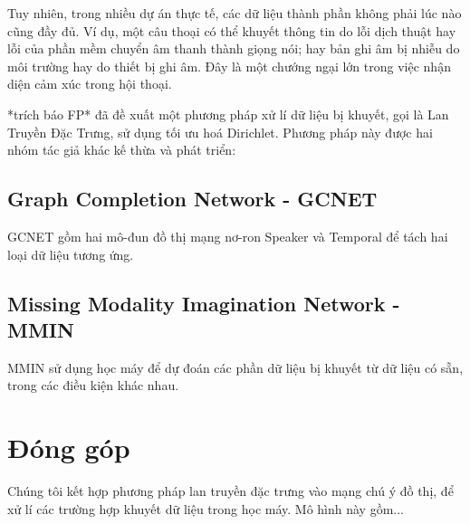 Tuy nhiên, trong nhiều dự án thực tế, các dữ liệu thành phần không phải lúc nào cũng đầy đủ. 
Ví dụ, một câu thoại có thể khuyết thông tin do lỗi dịch thuật hay lỗi của phần mềm chuyển âm thanh thành giọng nói; hay bản ghi âm bị nhiễu do môi trường hay do thiết bị ghi âm.
Đây là một chướng ngại lớn trong việc nhận diện cảm xúc trong hội thoại. 


*trích báo FP* đã đề xuất một phương pháp xử lí dữ liệu bị khuyết, gọi là Lan Truyền Đặc Trưng, sử dụng tối ưu hoá Dirichlet. 
Phương pháp này được hai nhóm tác giả khác kế thừa và phát triển: 

\subsection{Graph Completion Network - GCNET}
GCNET gồm hai mô-đun đồ thị mạng nơ-ron Speaker và Temporal để tách hai loại dữ liệu tương ứng. 


\subsection{Missing Modality Imagination Network - MMIN}
MMIN sử dụng học máy để dự đoán các phần dữ liệu bị khuyết từ dữ liệu có sẵn, trong các điều kiện khác nhau.

\section{Đóng góp}
\label{sec:Đóng góp}

Chúng tôi kết hợp phương pháp lan truyền đặc trưng vào mạng chú ý đồ thị, để xử lí các trường hợp khuyết dữ liệu trong học máy. 
Mô hình này gồm...